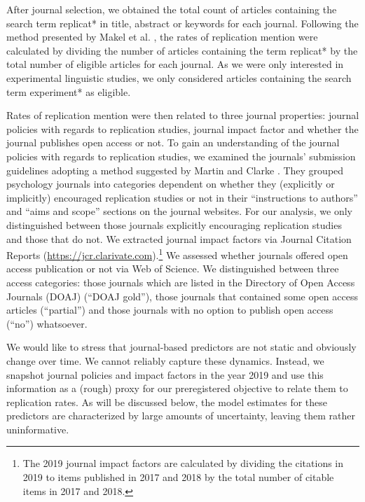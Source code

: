 \documentclass[cm,linguex]{glossa}
\begin{document}
After journal selection, we obtained the total count of articles containing the search term replicat* in title, abstract or keywords for each journal.
Following the method presented by Makel et al. \citeyearpar{makel_replications_2012}, the rates of replication mention were calculated by dividing the number of articles containing the term replicat* by the total number of eligible articles for each journal. As we were only interested in experimental linguistic studies, we only considered articles containing the search term experiment* as eligible.

Rates of replication mention were then related to three journal properties: journal policies with regards to replication studies, journal impact factor and whether the journal publishes open access or not.
To gain an understanding of the journal policies with regards to replication studies, we examined the journals' submission guidelines adopting a method suggested by Martin and Clarke \citeyearpar{martin_are_2017}.
They grouped psychology journals into categories dependent on whether they (explicitly or implicitly) encouraged replication studies or not in their ``instructions to authors'' and ``aims and scope'' sections on the journal websites. For our analysis, we only distinguished between those journals explicitly encouraging replication studies and those that do not.
We extracted journal impact factors via Journal Citation Reports (\url{https://jcr.clarivate.com}).\footnote{The 2019 journal impact factors are calculated by dividing the citations in 2019 to items published in 2017 and 2018 by the total number of citable items in 2017 and 2018.}
We assessed whether journals offered open access publication or not via Web of Science.
We distinguished between three access categories: those journals which are listed in the Directory of Open Access Journals (DOAJ) (``DOAJ gold''), those journals that contained some open access articles (``partial'') and those journals with no option to publish open access (``no'') whatsoever.

We would like to stress that journal-based predictors are not static and obviously change over time. We cannot reliably capture these dynamics. Instead, we snapshot journal policies and impact factors in the year 2019 and use this information as a (rough) proxy for our preregistered objective to relate them to replication rates. As will be discussed below, the model estimates for these predictors are characterized by large amounts of uncertainty, leaving them rather uninformative.
\end{document}
